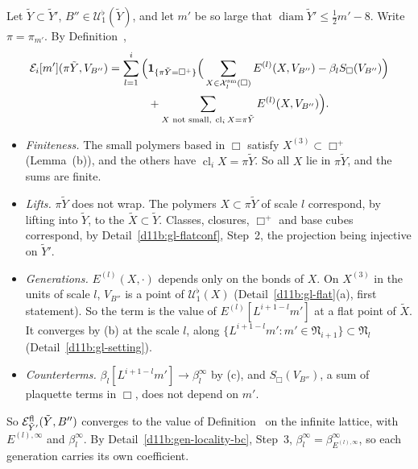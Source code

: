 \begin{step}
Let $\tilde Y\subset\tilde Y'$, $B''\in\mathcal U^\flat_1(\tilde Y)$, and let $m'$ be so large that $\operatorname{diam}\tilde Y'\le\frac12m'-8$. Write $\pi=\pi_{m'}$. By Definition~,
\[
\begin{aligned}
\mathcal E_i[m'](\pi\tilde Y,V_{B''})=\sum_{l=1}^i\Big(&\mathbf 1_{\{\pi\tilde Y=\Box^+\}}\Big(\sum_{X\in\mathcal X^{\rm sm}_l(\Box)}E^{(l)}(X,V_{B''})-\beta_lS_\Box(V_{B''})\Big)\\
&+\sum_{X\text{ not small},\ \operatorname{cl}_iX=\pi\tilde Y}E^{(l)}(X,V_{B''})\Big).
\end{aligned}
\]
\begin{itemize}
\item \emph{Finiteness.} The small polymers based in $\Box$ satisfy $X^{(3)}\subset\Box^+$ (Lemma~(b)), and the others have $\operatorname{cl}_iX=\pi\tilde Y$. So all $X$ lie in $\pi\tilde Y$, and the sums are finite.
\item \emph{Lifts.} $\pi\tilde Y$ does not wrap. The polymers $X\subset\pi\tilde Y$ of scale $l$ correspond, by lifting into $\tilde Y$, to the $\tilde X\subset\tilde Y$. Classes, closures, $\Box^+$ and base cubes correspond, by Detail~\ref{d11b:gl-flatconf}, Step~2, the projection being injective on $\tilde Y'$.
\item \emph{Generations.} $E^{(l)}(X,\cdot)$ depends only on the bonds of $X$. On $X^{(3)}$ in the units of scale $l$, $V_{B''}$ is a point of $\mathcal U^\flat_1(X)$ (Detail~\ref{d11b:gl-flat}(a), first statement). So the term is the value of $E^{(l)}[L^{i+1-l}m']$ at a flat point of $\tilde X$. It converges by (b) at the scale $l$, along $\{L^{i+1-l}m':m'\in\mathfrak N_{i+1}\}\subset\mathfrak N_l$ (Detail~\ref{d11b:gl-setting}).
\item \emph{Counterterms.} $\beta_l[L^{i+1-l}m']\to\beta^\infty_l$ by (c), and $S_\Box(V_{B''})$, a sum of plaquette terms in $\Box$, does not depend on $m'$.
\end{itemize}
So $\mathcal E^{\rm fl}_{\tilde Y'}(\tilde Y,B'')$ converges to the value of Definition~ on the infinite lattice, with $E^{(l),\infty}$ and $\beta^\infty_l$. By Detail~\ref{d11b:gen-locality-bc}, Step~3, $\beta^\infty_l=\beta^\infty_{E^{(l),\infty}}$, so each generation carries its own coefficient.
\end{step}

